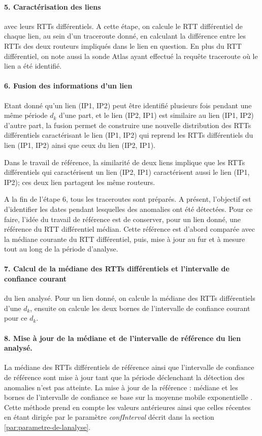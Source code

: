 \paragraph{5. Caractérisation des liens} avec leurs RTTs différentiels. A cette étape, on calcule le RTT différentiel de chaque  lien, au sein d'un traceroute donné, en calculant la différence entre les RTTs des deux routeurs impliqués dans le  lien en question. En plus du RTT différentiel, on note aussi la sonde Atlas ayant effectué la requête traceroute où le lien a été identifié. 

\paragraph{6. Fusion des informations d'un lien} Etant donné qu'un lien (IP1, IP2) peut être identifié plusieurs fois pendant une même période $d_k$ d'une part, et le lien (IP2, IP1) est similaire au lien  (IP1, IP2) d'autre part, la fusion permet de construire une nouvelle distribution des RTTs différentiels caractérisant le lien (IP1, IP2) qui reprend les RTTs différentiels du lien (IP1, IP2) ainsi que ceux du lien (IP2, IP1).

Dans le travail de référence, la similarité de deux liens  implique que les RTTs différentiels qui caractérisent un lien (IP2, IP1) caractérisent aussi le lien (IP1, IP2); ces deux lien partagent les même routeurs.


A la fin de l'étape 6, tous les traceroutes sont préparés. A présent, l'objectif est d'identifier les dates pendant lesquelles des anomalies ont été détectées. Pour ce faire, l'idée du travail de référence est de conserver, pour un lien donné, une référence du RTT différentiel médian.  Cette référence est d'abord comparée avec la médiane courante du RTT différentiel,  puis,  mise à jour au fur et à mesure   tout au long de la période d'analyse.

  
  \paragraph{7. Calcul de la médiane des RTTs différentiels et   l'intervalle de confiance courant} du lien analysé. Pour un lien donné, on calcule la médiane des RTTs différentiels d'une $d_k$, ensuite on calcule les deux bornes de l'intervalle de confiance courant pour ce $d_k$.  
  
 
  
  \paragraph{8. Mise à jour de la médiane et de l'intervalle de  référence du lien analysé.} La médiane des RTTs différentiels de référence ainsi que l'intervalle de confiance de référence sont mise à jour tant que la période déclenchant la détection des anomalies n'est pas atteinte.  La mise à jour de la référence : médiane et les bornes de l'intervalle de confiance se base sur la moyenne mobile exponentielle . Cette méthode prend en compte les valeurs antérieures ainsi que celles récentes en étant dirigée par le paramètre \textit{confInterval} décrit dans la section \ref{par:parametre-de-lanalyse}.
  

